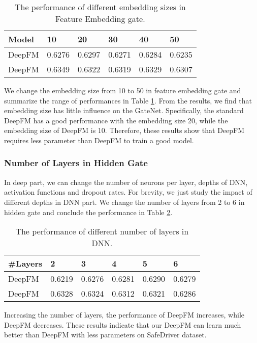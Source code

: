 \documentclass[sigconf,nonacm=true]{acmart}
\begin{document}
\begin{table}[!ht]
\centering
\caption{The performance of different embedding sizes in Feature Embedding gate.}
\label{table:t7}
\begin{tabular}{llllll}
Model & 10 & 20 & 30 & 40 & 50 \\ \hline
DeepFM & 0.6276 & 0.6297 & 0.6271 & 0.6284 & 0.6235 \\
DeepFM & 0.6349 & 0.6322 & 0.6319 & 0.6329 & 0.6307 \tabularnewline
\bottomrule
\end{tabular}
\end{table}
  

We change the embedding size from 10 to 50 in feature embedding gate and summarize the range of performances in Table \ref{table:t7}. From the results, we find that embedding size has little influence on the GateNet.
Specifically, the standard DeepFM has a good performance with the embedding size 20, while the embedding size of DeepFM is 10.
Therefore, these results show that DeepFM requires less parameter than DeepFM to train a good model.


\subsubsection{Number of Layers in Hidden Gate}

In deep part, we can change the number of neurons per layer, depths of DNN, activation functions and dropout rates.
For brevity, we just study the impact of different depths in DNN part.
We change the number of layers from 2 to 6 in hidden gate and conclude the performance in Table \ref{table:t8}.


\begin{table}[!ht]
\centering
\caption{The performance of different number of layers in DNN.}
\label{table:t8}
\begin{tabular}{llllll}
\#Layers & 2 & 3 & 4 & 5 & 6 \\ \hline
DeepFM & 0.6219 & 0.6276 & 0.6281 & 0.6290 & 0.6279 \\
DeepFM & 0.6328 & 0.6324 & 0.6312 & 0.6321 & 0.6286 \tabularnewline
\bottomrule
\end{tabular}
\end{table}


Increasing the number of layers, the performance of DeepFM increases, while DeepFM decreases.
These results indicate that our DeepFM can learn much better than DeepFM with less parameters on SafeDriver dataset.
\end{document}
